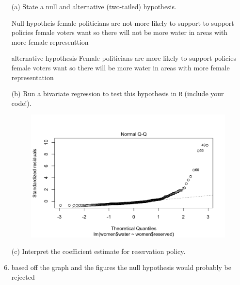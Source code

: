 \documentclass[12pt,letterpaper]{article}
\begin{document}
	
	\newpage
	\begin{enumerate}
		\item [(a)] State a null and alternative (two-tailed) hypothesis. 
		
		\item[Null hypotheis] female politicians are not more likely to support to support 
		policies female voters want so there will not be more water in areas
		with more female representtion
		\item[alternative hypothesis] Female politicians are more likely to support policies 
		female voters want so there will be more water in areas with more female representation
		
		\vspace{6cm}
		\item [(b)] Run a bivariate regression to test this hypothesis in \texttt{R} (include your code!).
		
		

\begin{figure}[H]
	\centering
	\includegraphics[width=0.7\linewidth]{graph1}
	\caption{}
	\label{fig:graph1}
\end{figure}

		

	
		
		
		\vspace{6cm}
		\item [(c)] Interpret the coefficient estimate for reservation policy. 
		\item based off the graph and the figures the null hypothesis would probably be rejected
		
	\end{enumerate}
	
\end{document}
